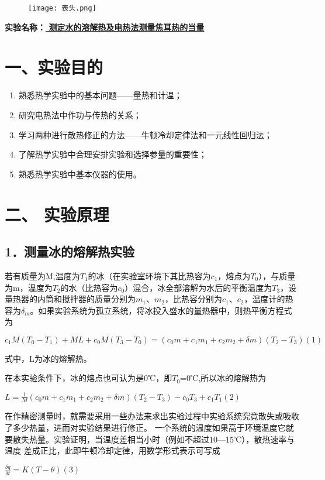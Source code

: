 \documentclass[11pt,a4paper,oneside]{article}
\begin{document}
\begin{figure}[H]
 \centering
  \texttt{[image: 表头.png]}
\end{figure}
\begin{center}
\textbf{{\large 实验名称：\uline{          测定水的溶解热及电热法测量焦耳热的当量       }}}
\end{center}

\section*{一、实验目的}
\begin{enumerate}
\item 熟悉热学实验中的基本问题——量热和计温；
\item 研究电热法中作功与传热的关系；
\item 学习两种进行散热修正的方法——牛顿冷却定律法和一元线性回归法；
\item 了解热学实验中合理安排实验和选择参量的重要性；
\item 熟悉热学实验中基本仪器的使用。
\end{enumerate}

\section*{二、 实验原理}
\subsection*{1．测量冰的熔解热实验}
	若有质量为M,温度为${T_1}$的冰（在实验室环境下其比热容为$c_1$，熔点为$T_0$），与质量为m，温度为$T_2$的水（比热容为$c_0$）混合，冰全部溶解为水后的平衡温度为$T_3$，设量热器的内筒和搅拌器的质量分别为$m_1$、$m_2$，比热容分别为$c_1$、$c_2$，温度计的热容为${\delta}_m$。如果实验系统为孤立系统，将冰投入盛水的量热器中，则热平衡方程式为
\begin{center}
$c_{1}M(T_{0}-T_{1})+ML+c_{0}M(T_{3}-T_{0})=(c_{0}m+c_{1}m_{1}+c_{2}m_{2}+\delta m)(T_{2}-T_{3})     (1)$
\end{center}
式中，L为冰的熔解热。

在本实验条件下，冰的熔点也可认为是0℃，即$T_0$=0℃,所以冰的熔解热为
\begin{center}
	$L=\frac{1}{M}(c_{0}m+c_{1}m_{1}+c_{2}m_{2}+\delta m)(T_{2}-T_{3})-c_{0}T_{3}+c_{1}T_{1}
	     (2)$
\end{center}

  在作精密测量时，就需要采用一些办法来求出实验过程中实验系统究竟散失或吸收了多少热量，进而对实验结果进行修正。
	一个系统的温度如果高于环境温度它就要散失热量。实验证明，当温度差相当小时（例如不超过10—15℃），散热速率与温度
	差成正比，此即牛顿冷却定律，用数学形式表示可写成
	\begin{center}
	$\displaystyle\frac{\delta q}{\delta t}=K(T-\theta )     (3)$
	\end{center}
\end{document}
